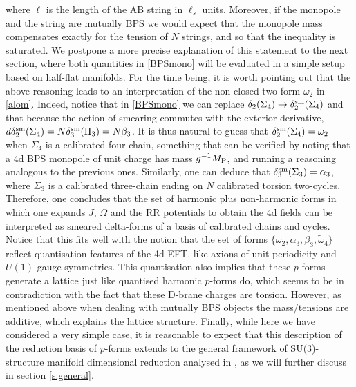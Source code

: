 \documentclass[11pt]{article}
\def\a {\alpha}
\def\b {\beta}
\def\om{\omega}
\begin{document}
where $\ell$ is the length of the AB string in $\ell_s$ units. Moreover, if the monopole and the string are mutually BPS we would expect that the monopole mass compensates exactly for the tension of $N$ strings, and so that the inequality is saturated. We postpone a more precise explanation of this statement to the next section, where both quantities in \eqref{BPSmono} will be evaluated in a simple setup based on half-flat manifolds. For the time being, it is worth pointing out that the above reasoning leads to an interpretation of the non-closed two-form $\om_2$ in \eqref{alom}. Indeed, notice that in \eqref{BPSmono} we can replace $\delta_2(\Sigma_4) \to \delta_2^{\rm sm}(\Sigma_4)$ and that because the action of smearing commutes with the exterior derivative, $d \delta_2^{\rm sm}(\Sigma_4) = N \delta_3^{\rm sm}(\Pi_3) = N \b_3$. It is thus natural to guess that $\delta_2^{\rm sm}(\Sigma_4) = \om_2$ when $\Sigma_4$ is a calibrated four-chain, something that can be verified by noting that a 4d BPS monopole of unit charge has mass $g^{-1} M_{\rm P}$, and running a reasoning analogous to the previous ones. Similarly, one can deduce that $\delta^{\rm sm}_3(\Sigma_3) = \a_3$, where $\Sigma_3$ is a calibrated three-chain ending on $N$ calibrated torsion two-cycles. Therefore, one concludes that the set of harmonic plus non-harmonic forms in which one expands $J$, $\Omega$ and the RR potentials to obtain the 4d fields can be interpreted as smeared delta-forms of a basis of calibrated chains and cycles. Notice that this fits well with the notion that the set of forms $\{ \om_2, \a_3, \b_3, \tilde{\om}_4\}$ reflect quantisation features of the 4d EFT, like axions of unit periodicity and $U(1)$ gauge symmetries. This quantisation also implies that these $p$-forms generate a lattice just like quantised harmonic $p$-forms do, which seems to be in contradiction with the fact that these D-brane charges are torsion. However, as mentioned above when dealing with mutually BPS objects the mass/tensions are additive, which explains the lattice structure. Finally, while here we have considered a very simple case, it is reasonable to expect that this description of the reduction basis of $p$-forms extends to the general framework of SU(3)-structure manifold dimensional reduction analysed in \cite{Grana:2005ny,Kashani-Poor:2006ofe}, as we will further discuss in section \ref{s:general}. 
\end{document}
